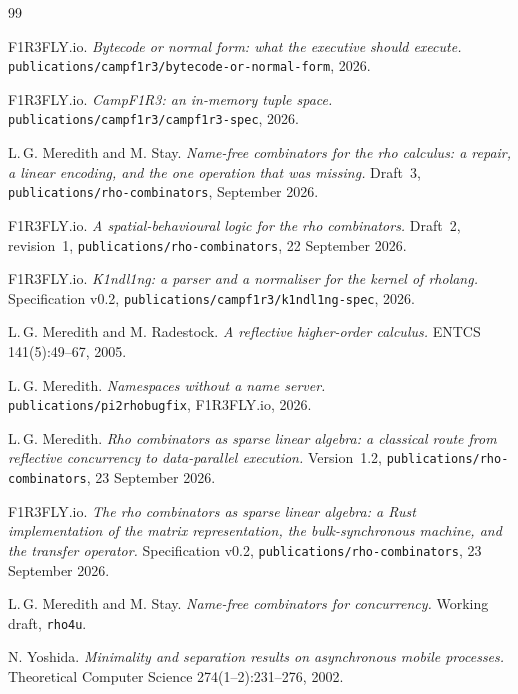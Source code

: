 \documentclass[11pt,a4paper]{article}
\newcommand{\code}[1]{\texttt{#1}}
\theoremstyle{definition}
\theoremstyle{plain}
\begin{document}
\begin{thebibliography}{99}

 F1R3FLY.io.
\emph{Bytecode or normal form: what the executive should execute.}
\code{publications/campf1r3/bytecode-or-normal-form}, 2026.

 F1R3FLY.io.
\emph{CampF1R3: an in-memory tuple space.}
\code{publications/campf1r3/campf1r3-spec}, 2026.

 L.\,G. Meredith and M. Stay.
\emph{Name-free combinators for the rho calculus: a repair, a linear encoding,
and the one operation that was missing.} Draft~3,
\code{publications/rho-combinators}, September 2026.

 F1R3FLY.io.
\emph{A spatial-behavioural logic for the rho combinators.} Draft~2,
revision~1, \code{publications/rho-combinators}, 22 September 2026.

 F1R3FLY.io.
\emph{K1ndl1ng: a parser and a normaliser for the kernel of rholang.}
Specification v0.2, \code{publications/campf1r3/k1ndl1ng-spec}, 2026.

 L.\,G. Meredith and M. Radestock.
\emph{A reflective higher-order calculus.} ENTCS 141(5):49--67, 2005.

 L.\,G. Meredith.
\emph{Namespaces without a name server.} \code{publications/pi2rhobugfix},
F1R3FLY.io, 2026.

 L.\,G. Meredith.
\emph{Rho combinators as sparse linear algebra: a classical route from
reflective concurrency to data-parallel execution.} Version~1.2,
\code{publications/rho-combinators}, 23 September 2026.

 F1R3FLY.io.
\emph{The rho combinators as sparse linear algebra: a Rust implementation of
the matrix representation, the bulk-synchronous machine, and the transfer
operator.} Specification v0.2, \code{publications/rho-combinators},
23 September 2026.

 L.\,G. Meredith and M. Stay.
\emph{Name-free combinators for concurrency.} Working draft, \code{rho4u}.

 N. Yoshida.
\emph{Minimality and separation results on asynchronous mobile processes.}
Theoretical Computer Science 274(1--2):231--276, 2002.

\end{thebibliography}
\end{document}
